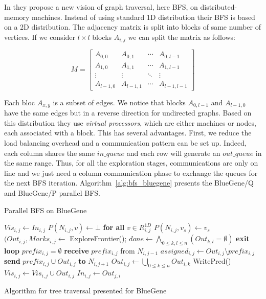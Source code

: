 In \cite{6468459} they propose a new vision of graph traversal, here BFS, on distributed-memory machines. 
Instead of using standard 1D distribution their BFS is based on a 2D distribution. 
The adjacency matrix is split into blocks of same number of vertices.
If we consider $l\times l$ blocks $A_{i,j}$ we can split the matrix as follows:

\[ M = \left[ \begin{array}{cccc}
A_{0,0} & A_{0,1} & \cdots & A_{0,l-1} \\
A_{1,0} & A_{1,1} & \cdots & A_{1,l-1} \\
\vdots  & \vdots  & \ddots & \vdots    \\
A_{l-1,0} & A_{l-1,1}  & \cdots & A_{l-1,l-1} \end{array} \right] \] 

Each bloc $A_{x,y}$ is a subset of edges. 
We notice that blocks $A_{0,l-1}$ and $A_{l-1,0}$ have the same edges but in a reverse direction for undirected graphs. 
Based on this distribution they use \textit{virtual processors}, which are either machines or nodes, each associated with a block.
This has several advantages.
First, we reduce the load balancing overhead and a communication pattern can be set up. 
Indeed, each column shares the same $in\_queue$ and each row will generate an $out\_queue$ in the same range. 
Thus, for all the exploration stages, communications are only on line and we just need a column communication phase to exchange the queues for the next BFS iteration.  
Algorithm~\ref{alg:bfs_bluegene} presents the BlueGene/Q and BlueGene/P parallel BFS.


\begin{algorithm}
\caption{Parallel BFS on BlueGene}\label{alg:bfs_bluegene}
\begin{algorithmic}[1]
\State $Vis_{i,j} \gets In_{i,j}$
\State $P(N_{i,j},v) \gets \bot$ \textbf{for all} $v \in R_{i,j}^{1D}$
\State $P(N_{i,j},v_s) \gets v_s$
\EndIf
{}
	\State$(Out_{i,j},Marks_{i,j} \gets $ ExploreFrontier();
	\State $done \gets \bigwedge\limits_{0 \leq k, l \leq n} (Out_{k,l} = \emptyset)$
		\State \textbf{exit loop}
	\EndIf
		\State $prefix_{i,j} = \emptyset$
	\Else 
		\State \textbf{receive} $prefix_{i,j}$ from $N_{i,j-1}$
	\EndIf
	\State $assigned_{i,j} \gets Out_{i,j} \setminus prefix_{i,j}$
		\State \textbf{send} $prefix_{i,j} \cup Out_{i,j}$ \textbf{to} $N_{i,j+1}$
	\EndIf
	\State $Out_{i,j} \gets \bigcup\limits_{0 \leq k \leq n} Out_{i,k}$
	\State WritePred()
	\State $Vis_{i,j} \gets Vis_{i,j} \cup Out_{i,j}$
	\State $In_{i,j} \gets Out_{j,i}$
\EndWhile
\end{algorithmic}
\caption{Algorithm for tree traversal presented for BlueGene}
\label{alg:bluegene}
\end{algorithm}

